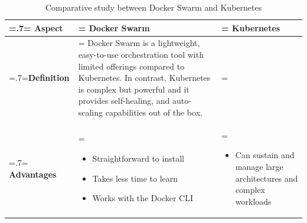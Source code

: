 \begin{table}[H]
    \renewcommand{\arraystretch}{1.5}%
    \caption{Comparative study between Docker Swarm and Kubernetes}
    \centering
    \medskip
    \begin{tabularx}{1\textwidth} {
            | >{\hsize=.7\hsize\linewidth=\hsize\centering\arraybackslash}X
            | >{\hsize=1.15\hsize\linewidth=\hsize\justifying\arraybackslash}X
            | >{\hsize=1.15\hsize\linewidth=\hsize\justifying\arraybackslash}X |}
        \hline
        \rowcolor{primary} \textbf {Aspect} & \textbf{Docker Swarm}                                                                                                                                                                                                                                                               & \textbf{Kubernetes}                                                      \\
        \hline
        \textbf {Definition}                & \multicolumn{2}{|>{\hsize=2.35\hsize}X|} {Docker Swarm is a lightweight, easy-to-use orchestration tool with limited offerings compared to Kubernetes. In contrast, Kubernetes is complex but powerful and it provides self-healing, and auto-scaling capabilities out of the box.}                                                                            \\
        \hline
        \textbf {Advantages}                & \begin{itemize}[leftmargin=*, topsep=0pt, itemsep=1pt, parsep=2pt]
                                                  \item Straightforward to install
                                                  \item Takes less time to learn
                                                  \item Works with the Docker CLI
                                              \end{itemize}                                                                                                                                                                                                                  & \begin{itemize}[leftmargin=*, topsep=0pt, itemsep=1pt, parsep=2pt]
                                                                                                                                                                                                                                                                                   \item Can sustain and manage large architectures and complex workloads

\end{itemize}
\end{tabularx}
\end{table}
